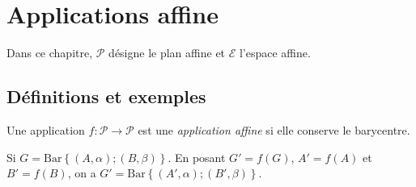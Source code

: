 
\TCDLessonStyleOn
\providecommand{\Plan}{\mathscr{P}}
\providecommand{\Espace}{\mathcal{E}}
\providecommand{\bary}[1]{\mathrm{Bar}\left\lbrace #1 \right\rbrace}
\providecommand{\Id}{\mathrm{Id}}
\chapter{Applications affine}
      Dans ce chapitre, $\Plan$ d\'esigne le plan affine et $\Espace$ l'espace affine.
      \section{D\'efinitions et exemples}
            \begin{defi}
                  Une application $f : \Plan \rightarrow \Plan$ est une \emph{application affine}
                  si elle conserve le barycentre.
                  
                  Si $G = \bary{(A,\alpha) ; (B,\beta)}$.
                  En posant $G' = f(G)$, $A' = f(A)$ et $B' = f(B)$, on a 
                  $G' = \bary{(A',\alpha) ; (B',\beta)}$.
            \end{defi}
